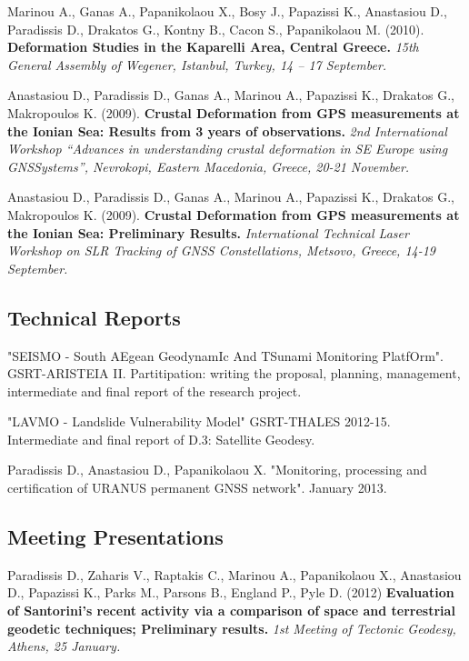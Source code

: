 \documentclass[a4paper]{Classes/cv_prof_en} %
\begin{document}
\begin{etaremune}
\item Marinou A., Ganas A., Papanikolaou X., Bosy J., Papazissi K., Anastasiou D., Paradissis D., Drakatos G., Kontny B., Cacon S., Papanikolaou M. (2010). \textbf{Deformation Studies in the Kaparelli Area, Central Greece.} \textit{15th General Assembly of Wegener, Istanbul, Turkey, 14 – 17 September.}
\item Anastasiou D., Paradissis D., Ganas A., Marinou A., Papazissi K., Drakatos G., Makropoulos K. (2009). \textbf{Crustal Deformation from GPS measurements at the Ionian Sea: Results from 3 years of observations.} \textit{2nd International Workshop “Advances in understanding crustal deformation in SE Europe using GNSSystems”, Nevrokopi, Eastern Macedonia, Greece, 20-21 November.}
\item Anastasiou D., Paradissis D., Ganas A., Marinou A., Papazissi K., Drakatos G., Makropoulos K. (2009). \textbf{Crustal Deformation from GPS measurements at the Ionian Sea: Preliminary Results.} \textit{International Technical Laser Workshop on SLR Tracking of GNSS Constellations, Metsovo, Greece, 14-19 September.}
\end{etaremune}

\subsection*{Technical Reports}
\renewcommand*{\labelenumi}{R\theenumi.}
\begin{etaremune}
\item "SEISMO - South AEgean GeodynamIc And TSunami Monitoring PlatfOrm". GSRT-ARISTEIA II. Partitipation: writing the proposal, planning, management, intermediate and final report of the research project.
\item "LAVMO - Landslide Vulnerability Model" GSRT-THALES 2012-15. Intermediate and final report of D.3: Satellite Geodesy.
\item Paradissis D., Anastasiou D., Papanikolaou X. "Monitoring, processing and certification of URANUS permanent GNSS network". January 2013.
\end{etaremune}


\subsection*{Meeting Presentations}
\renewcommand*{\labelenumi}{M\theenumi.}
\begin{etaremune}
\item Paradissis D., Zaharis V., Raptakis C., Marinou A., Papanikolaou X., Anastasiou D., Papazissi K., Parks M., Parsons B., England P., Pyle D. (2012) \textbf{Evaluation of Santorini's recent activity via a comparison of space and terrestrial geodetic techniques; Preliminary results.} \textit{1st Meeting of Tectonic Geodesy, Athens, 25 January.}
\end{etaremune}
\end{document}
